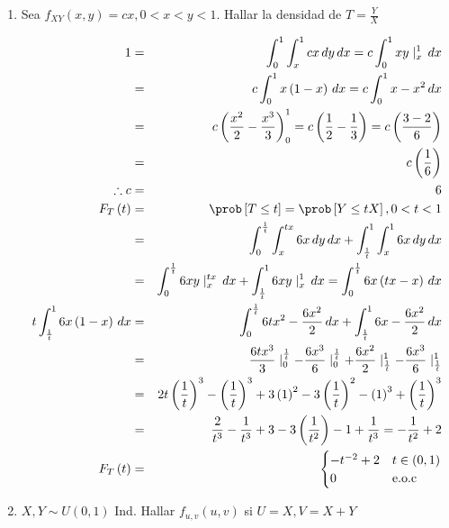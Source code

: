 \begin{enumerate}
\item Sea $f_{XY}\left( x,y\right) = cx, 0<x<y<1$. Hallar la densidad de $T=\frac{Y}{X}$

\begin{eqnarray*}
1&=& \int_{0}^{1} \int_{x}^{1} cx \, dy \, dx =  c \int_{0}^{1}  xy \mid _{x}^{1}  \, dx \\
&=&  c \int_{0}^{1} x \left( 1-x \right) \, dx = c \int_{0}^{1} x -x^{2} \, dx\\
&=& c \left( \frac{x^{2}}{2}- \frac{x^{3}}{3}\right)_{0}^{1}= c \left(\frac{1}{2}- \frac{1}{3} \right)= c \left(\frac{3-2}{6} \right)\\
&=& c \left(\frac{1}{6} \right)\\
\therefore c &=& 6\\
F_{T} \left( t 	\right)&=& \prob \left[T \leq t \right] = \prob \left[Y \leq tX \right] , 0<t<1\\
&=& \int  _{0}^{\frac{1}{t}} \int_{x}^{tx} 6x \, dy \, dx + \int  _{\frac{1}{t}}^{1} \int_{x}^{1} 6x \, dy \, dx \\
&=& \int  _{0}^{\frac{1}{t}} 6xy \mid_{x}^{tx}  \, dx + \int _{\frac{1}{t}}^{1}  6xy \mid_{x}^{1}  \, dx = \int _{0}^{\frac{1}{t}}  6x \left( tx-x \right)   \, dx \\
t \int_{\frac{1}{t}}^{1} 6x \left(1-x \right) \, dx &=& \int  _{0}^{\frac{1}{t}} 6tx^{2}- \frac{6x^{2}}{2}   \, dx + \int _{\frac{1}{t}}^{1}  6x- \frac{6x^{2}}{2}   \, dx \\
&=& \frac{6tx^{3}}{3}\mid_{0}^{\frac{1}{t}} - \frac{6x^{3}}{6}\mid_{0}^{\frac{1}{t}} + \frac{6x^{2}}{2}\mid_{\frac{1}{t}}^{1} - \frac{6x^{3}}{6}\mid_{\frac{1}{t}}^{1} \\
&=& 2t \left(\frac{1}{t}\right) ^{3}- \left(\frac{1}{t}\right) ^{3}+3\left( 1 \right)^{2}- 3\left( \frac{1}{t}\right)^{2}-\left(1 \right)^{3}+\left( \frac{1}{t} \right)^{3}\\
&=& \frac{2}{t^{3}}- \frac{1}{t^{3}}+3-3\left(\frac{1}{t^{2}} \right)-1+\frac{1}{t^{3}}= - \frac{1}{t^{2}}+2\\
F_{T}\left(t \right)&=&\begin{cases}
-t^{-2}+2 & t \in \left( 0,1 \right) \\
0 & \textrm{e.o.c}
\end{cases}\\
\end{eqnarray*}

\item $X,Y \sim U\left(0,1\right)$ Ind. Hallar $f_{u,v}\left(u,v \right)$ si $U=X, V= X+Y$


\end{enumerate}
